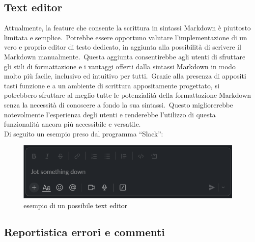 \subsection{Text editor}\label{sec:cap_sec_subsec}
Attualmente, la feature che consente la scrittura in sintassi Markdown è piuttosto limitata e semplice.\
Potrebbe essere opportuno valutare l'implementazione di un vero e proprio editor di testo dedicato, 
in aggiunta alla possibilità di scrivere il Markdown manualmente.\ Questa aggiunta consentirebbe agli 
utenti di sfruttare gli stili di formattazione e i vantaggi offerti dalla sintassi Markdown in modo molto più facile, 
inclusivo ed intuitivo per tutti.\ Grazie alla presenza di appositi tasti funzione e a un ambiente di scrittura 
appositamente progettato, si potrebbero sfruttare al meglio tutte le potenzialità della formattazione Markdown 
senza la necessità di conoscere a fondo la sua sintassi.\ Questo migliorerebbe notevolmente l'esperienza degli 
utenti e renderebbe l'utilizzo di questa funzionalità ancora più accessibile e versatile.
\\
Di seguito un esempio preso dal programma ``Slack'':
\begin{figure}[H]
	\centering
	\includegraphics[width=\textwidth]{img/textEditor.png}
	\caption{esempio di un possibile text editor}
	\label{fig:textEditor}
\end{figure}
%
\subsection{Reportistica errori e commenti}\label{sec:cap_sec_subsec}
